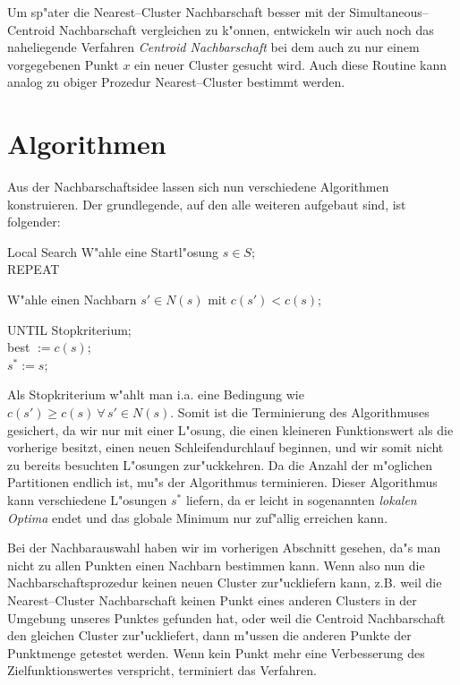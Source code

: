 Um sp"ater die Nearest--Cluster Nachbarschaft besser mit der 
Simul\-taneous--Centro\-id Nachbarschaft
vergleichen zu k"onnen, entwickeln wir auch noch das naheliegende
Verfahren {\em Cent\-roid Nachbarschaft} bei dem auch zu nur 
einem vorgegebenen Punkt $x$ ein neuer Cluster gesucht wird.
Auch diese Routine kann analog zu obiger Prozedur Nearest--Cluster
bestimmt werden.

\section{Algorithmen}
\label{algorithmeneins}

Aus der Nachbarschaftsidee lassen sich nun verschiedene Algorithmen
konstruieren. Der grundlegende, auf den alle weiteren aufgebaut sind,
ist folgender:

\begin{algorithm}{Local Search}
W"ahle eine Startl"osung $s \in S$;\\
REPEAT
\begin{Block}
	W"ahle einen Nachbarn $s' \in N(s)$ mit $c(s') < c(s)$;
\end{Block}
UNTIL Stopkriterium;\\
best $ := c(s)$;\\
$s^\ast := s$;
\end{algorithm}

Als Stopkriterium w"ahlt man i.a. eine Bedingung wie $c(s') \geq c(s)
\ \forall\, s' \in N(s)$.
Somit ist die Terminierung des Algorithmuses gesichert, da  wir nur mit einer
L"osung, die einen kleineren Funktionswert als die vorherige besitzt,
einen neuen Schleifendurchlauf beginnen, und wir somit nicht zu 
bereits besuchten L"osungen zur"uckkehren.
Da die Anzahl der m"oglichen Partitionen endlich ist, mu"s der
Algorithmus terminieren.
Dieser Algorithmus kann verschiedene L"osungen $s^*$ liefern, da er leicht
in sogenannten {\em lokalen Optima} endet und das globale Minimum nur
zuf"allig erreichen kann. 

Bei der Nachbarauswahl haben wir im vorherigen Abschnitt gesehen, 
da"s man nicht zu allen Punkten einen Nachbarn bestimmen kann.
Wenn also nun
die Nachbarschaftsprozedur keinen neuen Cluster zur"uckliefern
kann, z.B. weil die Nearest--Cluster Nachbarschaft keinen Punkt eines
anderen Clusters in der Umgebung unseres Punktes gefunden hat, oder weil die
Centroid Nachbarschaft den gleichen Cluster zur"uckliefert, dann 
m"ussen die anderen Punkte der Punktmenge getestet werden. Wenn kein
Punkt mehr eine Verbesserung des Zielfunktionswertes verspricht,
terminiert das Verfahren.

